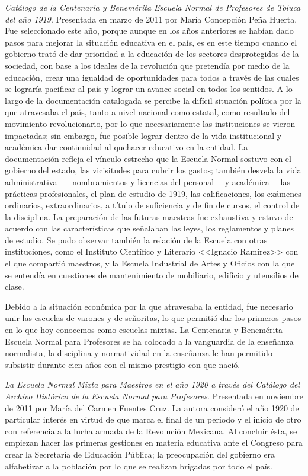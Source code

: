 \smallskip 
\noindent \textsl{Catálogo de la Centenaria y Benemérita 
Escuela Normal de Profesores de Toluca del año 1919}. Presentada en 
marzo de 2011 por María Concepción Peña Huerta. Fue seleccionado este 
año, porque aunque en los años anteriores se habían dado pasos para 
mejorar la situación educativa en el país, es en este tiempo cuando el 
gobierno trató de dar prioridad a la educación de los sectores 
desprotegidos de la sociedad, con base a los ideales de la revolución 
que pretendía por medio de la educación, crear una igualdad de 
oportunidades para todos a través de las cuales se lograría pacificar 
al país y lograr un avance social en todos los sentidos. A lo largo de la 
documentación catalogada se percibe la difícil situación política por 
la que atravesaba el país, tanto a  nivel nacional como estatal, como 
resultado del movimiento revolucionario, por lo que  necesariamente las 
instituciones se vieron impactadas; sin embargo, fue posible lograr 
dentro de la vida institucional y académica dar continuidad al quehacer 
educativo en la entidad. La documentación refleja el vínculo estrecho 
que la Escuela Normal sostuvo con el gobierno del estado, las 
vicisitudes para cubrir los gastos; también desvela la vida administrativa 
{---}~{nombramientos} y licencias del personal--- y académica ---las prácticas 
profesionales, el plan de estudio de 1919, las calificaciones, los 
exámenes ordinarios, extraordinarios, a título de suficiencia y de fin 
de cursos, el control de la disciplina. La preparación de las futuras 
maestras fue exhaustiva y estuvo de acuerdo con las características que señalaban 
las leyes, los reglamentos y planes de estudio. Se pudo observar 
también la relación de la Escuela con otras instituciones, como el 
Instituto Científico y Literario <<Ignacio Ramírez>> con el que 
compartió maestros, y la Escuela Industrial de Artes y Oficios con la 
que se entendía en cuestiones de mantenimiento de mobiliario, edificio 
y utensilios de clase.

Debido a la situación económica por la que atravesaba la entidad, fue 
necesario unir las escuelas de varones y de señoritas, lo que permitió 
dar los primeros pasos en lo que hoy conocemos como escuelas mixtas. La 
Centenaria y Benemérita Escuela Normal para Profesores se ha colocado a 
la vanguardia de la enseñanza  normalista, la disciplina y normatividad 
en la enseñanza le han permitido subsistir durante cien años con el 
mismo prestigio con que nació.
\enlargethispage{\baselineskip}

\smallskip 
\noindent \textsl{La Escuela Normal Mixta para Maestros en 
el año 1920 a través del Catálogo del Archivo Histórico de la Escuela 
Normal para Profesores}. Presentada en noviembre de 2011 por María 
del Carmen Fuentes Cruz. La autora consideró el año 1920 de particular 
interés en virtud de que marca el final de un periodo y el inicio de 
otro con referencia a la lucha armada de la Revolución Mexicana. Al 
concluir ésta,  se empiezan hacer las 
primeras gestiones en materia educativa ante el Congreso para 
crear la Secretaría de Educación Pública; la preocupación del gobierno 
era alfabetizar a la población por lo que se realizan brigadas por todo el país.

